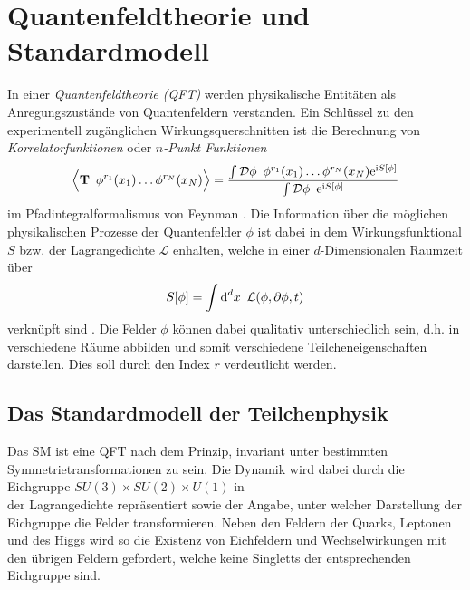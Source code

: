 \clearpage
\section{Quantenfeldtheorie und Standardmodell}
  In einer \textit{Quantenfeldtheorie (QFT)} werden physikalische Entitäten 
  als Anregungszustände von Quantenfeldern 
  verstanden. Ein Schlüssel zu den experimentell zugänglichen 
  Wirkungsquerschnitten ist die Berechnung von \textit{Korrelatorfunktionen} 
  oder \textit{$n$-Punkt Funktionen}
  \begin{equation}
   \Big\langle \textbf{T} \,\,\, \phi^{r_1}(x_1) \ldots \phi^{r_N}(x_N) 
   \Big\rangle
   =\frac{\int \mathcal{D}\phi \,\,\, \phi^{r_1}(x_1) \ldots \phi^{r_N}(x_N) 
   \text{e}^{\text{i} S[\phi]}}{\int \mathcal{D}\phi \,\,\, \text{e}^{\text{i} S[\phi]} }
   \label{renormierung:Korrelator_definition}
  \end{equation}
  im Pfadintegralformalismus von Feynman \cite{Schwartz}. Die Information über 
  die möglichen 
  physikalischen Prozesse der Quantenfelder $\phi$ 
  ist dabei in dem Wirkungsfunktional $S$ bzw. der Lagrangedichte $\mathcal{L}$ 
  enhalten, welche in einer $d$-Dimensionalen Raumzeit über 
  \begin{equation}
    S[\phi] = \int \text{d}^d x \,\,\, \mathcal{L}(\phi,\partial \phi, t) 
    \label{renormierung:Wirkung_definition}
  \end{equation}
  verknüpft sind \cite{Schwartz}. Die Felder $\phi$ können dabei qualitativ 
  unterschiedlich sein, d.h. in verschiedene Räume abbilden und somit 
  verschiedene Teilcheneigenschaften darstellen. Dies soll durch den Index 
  $r$ verdeutlicht werden.

  \subsection{Das Standardmodell der Teilchenphysik}
    Das SM ist eine QFT nach dem Prinzip, invariant unter bestimmten 
    Symmetrietransformationen zu sein. Die Dynamik wird dabei durch die 
    Eichgruppe $SU(3)\times SU(2)\times U(1)$ in \\der Lagrangedichte 
    repräsentiert sowie der Angabe, 
    unter welcher Darstellung der Eichgruppe die Felder transformieren. 
    Neben den Feldern der Quarks, Leptonen und des Higgs wird so die 
    Existenz von Eichfeldern und Wechselwirkungen mit den übrigen Feldern 
    gefordert, welche keine Singletts der entsprechenden Eichgruppe sind.

